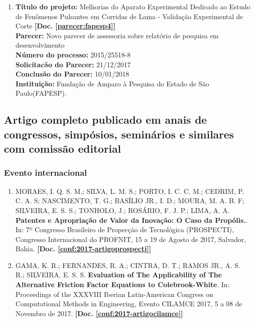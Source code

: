 \documentclass[a4paper,oneside,10pt]{article}
\begin{document}
\begin{enumerate}
\item \textbf{Título do projeto:} Melhorias do Aparato Experimental Dedicado ao Estudo de Fenômenos Pulsantes em Corridas de Lama - Validação Experimental de Corte \textbf{[Doc. \ref{parecer:fapesp4}]}\\
      \textbf{Parecer:} Novo parecer de assessoria sobre relatório de pesquisa em desenvolvimento\\
      \textbf{Número do processo:} 2015/25518-8\\
      \textbf{Solicitacão do Parecer:} 21/12/2017\\
      \textbf{Conclusão do Parecer:} 10/01/2018\\
      \textbf{Instituição:} Fundação de Amparo à Pesquisa do Estado de São Paulo(FAPESP).  
        
\end{enumerate}


\subsection{Artigo completo publicado em anais de congressos, simpósios, seminários e similares com comissão editorial}
\vspace{0.3cm}


\subsubsection{Evento internacional}
\vspace{0.3cm}

\begin{enumerate}
\renewcommand{\labelenumi}{{\large\bfseries\arabic{enumi}.}}

\item MORAES, I. Q. S. M.; SILVA, L. M. S.; PORTO, I. C. C. M.; CEDRIM, P. C. A. S; NASCIMENTO, T. G.;  BASÍLIO JR., I. D.; MOURA, M. A. B. F; SILVEIRA, E. S. S.; TONHOLO, J.;  ROSÁRIO, F. J. P.; LIMA, A. A. \textbf{Patentes e Apropriação de Valor da Inovação: O Caso da Propólis.}. In: 7º Congresso Brasileiro de Propecção de Tecnológica (PROSPECTI), Congresso Internacional do PROFNIT, 15 a 19 de Agosto de 2017, Salvador, Bahia. \textbf{[Doc. \ref{conf:2017-artigoprospecti}]}

\item GAMA, K. R.; FERNANDES, R. A.; CINTRA, D. T.; RAMOS JR., A. S. R.; SILVEIRA, E. S. S. \textbf{Evaluation of The Applicability of The Alternative  Friction Factor Equations to Colebrook-White}. In: Proceedings of the XXXVIII Iberian Latin-American Congress on Computational Methods in Engineering, Evento CILAMCE 2017, 5 a 08 de Novembro  de 2017. \textbf{[Doc. \ref{conf:2017-artigocilamce}]}

\end{enumerate}
\end{document}
